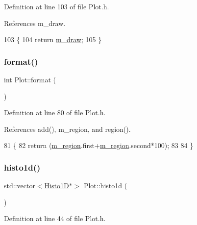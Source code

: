Definition at line 103 of file Plot.\+h.



References m\+\_\+draw.


\begin{DoxyCode}
103                   \{
104     \textcolor{keywordflow}{return} \hyperlink{classPlot_a83ffbf3effe6a2f8befa6375882f3994}{m\_draw};
105   \}
\end{DoxyCode}
\mbox{\label{classPlot_a4a7404547e8a9d5dd0a921bfff3ed406}} 
\subsubsection{\texorpdfstring{format()}{format()}}
{\footnotesize\ttfamily int Plot\+::format (\begin{DoxyParamCaption}{ }\end{DoxyParamCaption})\hspace{0.3cm}{\ttfamily [inline]}}



Definition at line 80 of file Plot.\+h.



References add(), m\+\_\+region, and region().


\begin{DoxyCode}
81   \{
82     \textcolor{keywordflow}{return} (\hyperlink{classPlot_aabcbba1cfc66babcbcd647fdf90cdbf1}{m\_region}.first+\hyperlink{classPlot_aabcbba1cfc66babcbcd647fdf90cdbf1}{m\_region}.second*100);
83 
84   \}
\end{DoxyCode}
\mbox{\label{classPlot_ad6f34fe5ab1a94b411b4fc121e0641bc}} 
\subsubsection{\texorpdfstring{histo1d()}{histo1d()}}
{\footnotesize\ttfamily std\+::vector$<$\hyperlink{classHisto1D}{Histo1D}$\ast$$>$ Plot\+::histo1d (\begin{DoxyParamCaption}{ }\end{DoxyParamCaption})\hspace{0.3cm}{\ttfamily [inline]}}



Definition at line 44 of file Plot.\+h.



